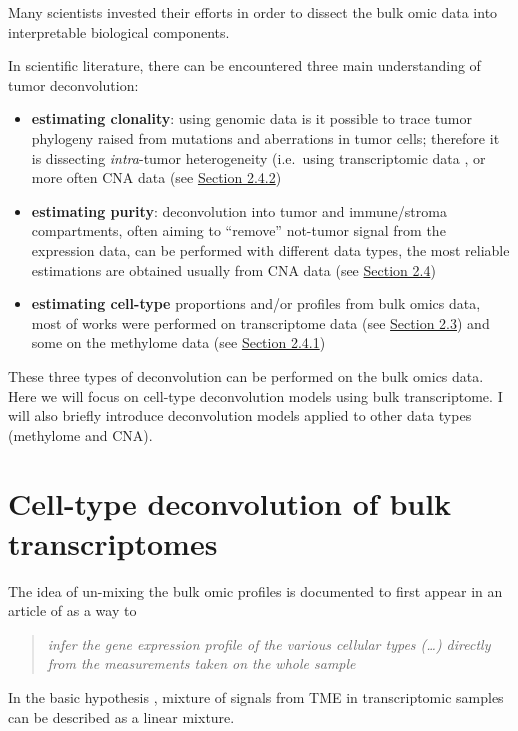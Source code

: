 \documentclass[12pt,]{book}
\providecommand{\tightlist}{%
  \setlength{\itemsep}{0pt}\setlength{\parskip}{0pt}}
\theoremstyle{definition}
\theoremstyle{definition}
\theoremstyle{definition}
\theoremstyle{remark}
\begin{document}
Many scientists invested their efforts in order to dissect the bulk omic
data into interpretable biological components.

In scientific literature, there can be encountered three main
understanding of tumor deconvolution:

\begin{itemize}
\tightlist
\item
  \textbf{estimating clonality}: using genomic data is it possible to
  trace tumor phylogeny raised from mutations and aberrations in tumor
  cells; therefore it is dissecting \emph{intra}-tumor heterogeneity
  (i.e.~using transcriptomic data \citep{Schwartz2010}, or more often
  CNA data (see \protect\hyperlink{otherDecon}{Section 2.4.2})
\item
  \textbf{estimating purity}: deconvolution into tumor and immune/stroma
  compartments, often aiming to ``remove'' not-tumor signal from the
  expression data, can be performed with different data types, the most
  reliable estimations are obtained usually from CNA data (see
  \protect\hyperlink{otherDecon}{Section 2.4})
\item
  \textbf{estimating cell-type} proportions and/or profiles from bulk
  omics data, most of works were performed on transcriptome data (see
  \protect\hyperlink{cellTypeTrans}{Section 2.3}) and some on the
  methylome data (see \protect\hyperlink{otherDecon}{Section 2.4.1})
\end{itemize}

These three types of deconvolution can be performed on the bulk omics
data. Here we will focus on cell-type deconvolution models using bulk
transcriptome. I will also briefly introduce deconvolution models
applied to other data types (methylome and CNA).

\hypertarget{cellTypeTrans}{%
\section{Cell-type deconvolution of bulk
transcriptomes}\label{cellTypeTrans}}

The idea of un-mixing the bulk omic profiles is documented to first
appear in an article of \citet{Venet2001} as a way to

\begin{quote}
\emph{infer the gene expression profile of the various cellular types
(\ldots{}) directly from the measurements taken on the whole sample}
\end{quote}

In the basic hypothesis \citep{Abbas2009}, mixture of signals from TME
in transcriptomic samples can be described as a linear mixture.
\end{document}
